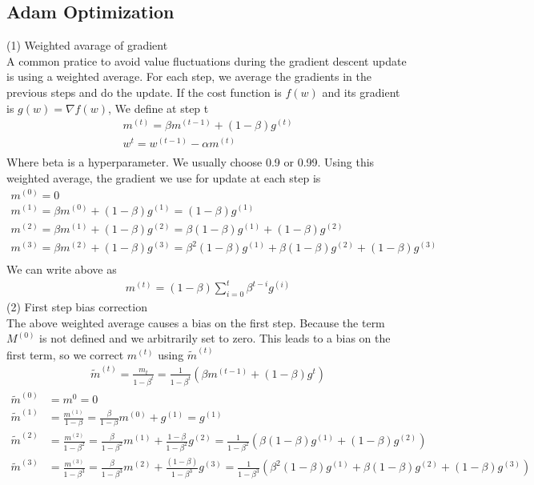 \documentclass[a4paper]{article}
\begin{document}
\subsection{Adam Optimization}
(1) Weighted avarage of gradient\\
A common pratice to avoid value fluctuations during the gradient descent update is using a weighted average. For each step,
we average the gradients in the previous steps and do the update. If the cost function is $f(w)$ and its gradient is
$g(w)=\nabla f(w)$, We define at step t
\begin{align*}
	m^{(t)} = \beta m^{(t-1)} + (1 - \beta)g^{(t)} \\
	w^t = w^{(t-1)} - \alpha m^{(t)} \\
\end{align*}
Where beta is a hyperparameter. We usually choose 0.9 or 0.99. Using this weighted average, the gradient we use for update at each step is
\begin{align*}
	m^{(0)}  = 0 \\
	m^{(1)}  = \beta m^{(0)} + (1 - \beta)g^{(1)} = (1 - \beta)g^{(1)} \\
	m^{(2)}  = \beta m^{(1)} + (1 - \beta)g^{(2)} = \beta(1 - \beta)g^{(1)} + (1 - \beta)g^{(2)} \\
	m^{(3)}  = \beta m^{(2)} + (1 - \beta)g^{(3)} = \beta^2(1 - \beta)g^{(1)} + \beta(1 - \beta)g^{(2)} + (1 - \beta)g^{(3)} \\
\end{align*}
We can write above as
\begin{align*}
	m^{(t)} = (1- \beta) \sum_{i=0}^t \beta^{t-i}g^{(i)}
\end{align*}
(2) First step bias correction\\
The above weighted average causes a bias on the first step. Because the term $M^{(0)}$ is not defined and we arbitrarily set to zero. This leads to a bias on the first term, so we correct $m^{(t)}$ using $\tilde m^{(t)}$
\begin{align*}
	\tilde m^{(t)} = \frac{m_t}{1 - \beta^t} = \frac{1}{1 - \beta^t}(\beta m^{(t-1)} + (1 - \beta)g^{t})
\end{align*}
\begin{align*}
	\tilde m^{(0)} & = m^0  = 0 \\
	\tilde m^{(1)} & = \frac{m^{(1)}}{1 - \beta}= \frac{\beta}{1 - \beta} m^{(0)} + g^{(1)} = g^{(1)} \\
	\tilde m^{(2)} & = \frac{m^{(2)}}{1 - \beta^2} = \frac{\beta}{1 - \beta^2} m^{(1)} 
	+ \frac{1 - \beta}{1 - \beta^2}g^{(2)} 
		= \frac{1}{1 - \beta^2}(\beta(1 - \beta)g^{(1)} + (1 - \beta)g^{(2)}) \\
	\tilde m^{(3)} & =\frac{m^{(3)}}{1 - \beta^3} = \frac{\beta}{1 - \beta^3} m^{(2)} + \frac{(1 - \beta)}{1 - \beta^3}g^{(3)} 
	= \frac{1}{1 - \beta^3}( \beta^2(1 - \beta)g^{(1)} + \beta(1 - \beta)g^{(2)} + (1 - \beta)g^{(3)} )\\
\end{align*}
\end{document}
